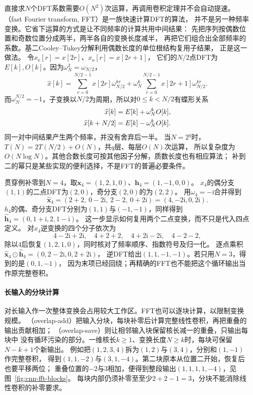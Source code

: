 直接求$N$个DFT系数需要$O(N^2)$次运算，再调用卷积定理并不会自动提速。
（fast Fourier transform, FFT）是一族快速计算DFT的算法，
并不是另一种频率变换。它省下运算的方式是让不同频率的计算共用中间结果：
先把序列按偶数位置和奇数位置分成两半，两半各自的变换长度减半，
再把它们组合出全部频率的系数。基二Cooley--Tukey分解利用偶数长度的单位根结构复用子结果，
正是这一做法。
令$x_{\mathrm e}[r]=x[2r]$、$x_{\mathrm o}[r]=x[2r+1]$，
它们的$N/2$点DFT为$E[k],O[k]$。因为$\omega_N^2=\omega_{N/2}$，
\[
  \widehat x[k]
  =\sum_{r=0}^{N/2-1}x[2r]\omega_{N/2}^{kr}
   +\omega_N^k\sum_{r=0}^{N/2-1}x[2r+1]\omega_{N/2}^{kr}.
\]
而$\omega_N^{N/2}=-1$，子变换以$N/2$为周期，所以对$0\leq k<N/2$有蝶形关系
\begin{align}
  \widehat x[k]&=E[k]+\omega_N^kO[k],\notag\\
  \widehat x[k+N/2]&=E[k]-\omega_N^kO[k].
  \label{eq:signal-analysis-fft-butterfly}
\end{align}
\BookEquationAliases{\label{eq:cnn-fft-butterfly}}
同一对中间结果产生两个频率，并没有舍弃后一半。
当$N=2^q$时，$T(N)=2T(N/2)+O(N)$，共$q$层、每层$O(N)$次运算，
所以复杂度为$O(N\log N)$。其他合数长度可按其他因子分解，质数长度也有相应算法；
补到二的幂只是某些实现的便利选择，不是FFT的普遍必要条件。

贯穿例补零到$N=4$，取$\bm x_4=(1,2,1,0)$、$\bm h_4=(1,-1,0,0)$。
$x_4$的偶分支$(1,1)$的二点DFT为$(2,0)$，奇分支$(2,0)$的为$(2,2)$。
用$\omega_4=-\mathrm i$合并得到
\[
  \widehat{\bm x}_4=(2+2,\ 0-2\mathrm i,\ 2-2,\ 0+2\mathrm i)
  =(4,-2\mathrm i,0,2\mathrm i).
\]
$h_4$的偶、奇分支DFT分别为$(1,1)$与$(-1,-1)$，同样得到
$\widehat{\bm h}_4=(0,1+\mathrm i,2,1-\mathrm i)$。
这一步显示如何复用两个二点变换，而不只是代入四点定义。
对$x_4$逆变换的四个分子依次为
\[
  4-2\mathrm i+2\mathrm i,\quad 4+2+2,\quad
  4+2\mathrm i-2\mathrm i,\quad 4-2-2,
\]
除以$4$后恢复$(1,2,1,0)$，同时核对了频率顺序、指数符号及归一化。
逐点乘积
$\widehat{\bm x}_4\odot\widehat{\bm h}_4=(0,2-2\mathrm i,0,2+2\mathrm i)$，
逆DFT给出$(1,1,-1,-1)$。若只用$N=3$，得到的是$(0,1,-1)$，
因为末项已经回绕；再精确的FFT也不能把这个循环输出当作原完整卷积。

\paragraph{长输入的分块计算}

对长输入作一次整体变换会占用较大工作区。FFT也可以逐块计算，以限制变换规模。
（overlap-add）把输入分块，每块补零后计算完整线性卷积，再把重叠的输出贡献相加；
（overlap-save）则让相邻输入块保留核长减一的重叠，只输出每块中
没有循环污染的部分。一维核长$k\geq1$、变换长度$N\geq k$时，每块可保留$N-k+1$个新输出。
例如把$(1,2,3,4)$拆为$(1,2)$与$(3,4)$，分别和$(1,-1)$作完整卷积，
得到$(1,1,-2)$与$(3,1,-4)$。第二块原本从位置二开始，恢复后也要平移两位；
重叠位置的$-2$与$3$相加，便得到整段输出$(1,1,1,1,-4)$，见图~\ref{fig:cnn-fft-blocks}。
每块内部仍须补零至至少$2+2-1=3$，分块不能消除线性卷积的补零要求。

